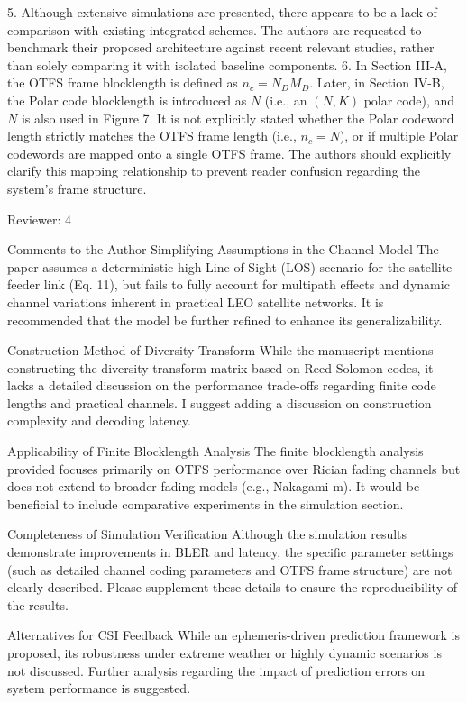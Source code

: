 5. Although extensive simulations are presented, there appears to be a lack of comparison with existing integrated schemes. The authors are requested to benchmark their proposed architecture against recent relevant studies, rather than solely comparing it with isolated baseline components.
6. In Section III-A, the OTFS frame blocklength is defined as $n_c = N_D M_D$. Later, in Section IV-B, the Polar code blocklength is introduced as $N$ (i.e., an $(N, K)$ polar code), and $N$ is also used in Figure 7. It is not explicitly stated whether the Polar codeword length strictly matches the OTFS frame length (i.e., $n_c = N$), or if multiple Polar codewords are mapped onto a single OTFS frame. The authors should explicitly clarify this mapping relationship to prevent reader confusion regarding the system's frame structure.

Reviewer: 4

Comments to the Author
Simplifying Assumptions in the Channel Model
   The paper assumes a deterministic high-Line-of-Sight (LOS) scenario for the satellite feeder link (Eq. 11), but fails to fully account for multipath effects and dynamic channel variations inherent in practical LEO satellite networks. It is recommended that the model be further refined to enhance its generalizability.

Construction Method of Diversity Transform
   While the manuscript mentions constructing the diversity transform matrix based on Reed-Solomon codes, it lacks a detailed discussion on the performance trade-offs regarding finite code lengths and practical channels. I suggest adding a discussion on construction complexity and decoding latency.

Applicability of Finite Blocklength Analysis
   The finite blocklength analysis provided focuses primarily on OTFS performance over Rician fading channels but does not extend to broader fading models (e.g., Nakagami-m). It would be beneficial to include comparative experiments in the simulation section.

Completeness of Simulation Verification
   Although the simulation results demonstrate improvements in BLER and latency, the specific parameter settings (such as detailed channel coding parameters and OTFS frame structure) are not clearly described. Please supplement these details to ensure the reproducibility of the results.

Alternatives for CSI Feedback
   While an ephemeris-driven prediction framework is proposed, its robustness under extreme weather or highly dynamic scenarios is not discussed. Further analysis regarding the impact of prediction errors on system performance is suggested.

